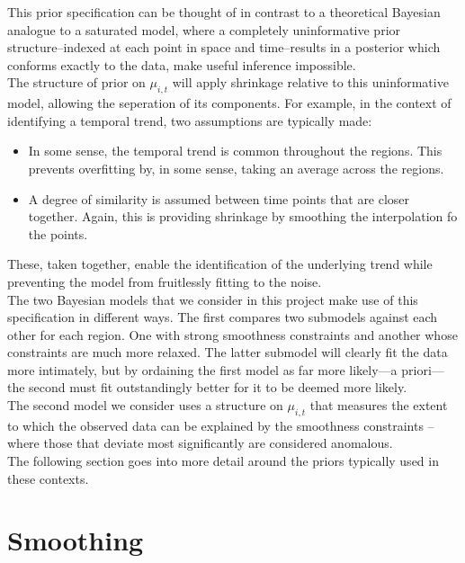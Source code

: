 \documentclass[11pt]{report}
\begin{document}
This prior specification can be thought of in contrast to a theoretical Bayesian analogue to a saturated model, where a completely uninformative prior structure--indexed at each point in space and time--results in a posterior which conforms exactly to the data, make useful inference impossible. \\

The structure of prior on $\mu_{i,t}$ will apply shrinkage relative to this uninformative model, allowing the seperation of its components. For example, in the context of identifying a temporal trend, two assumptions are typically made: 
\begin{itemize}
\item In some sense, the temporal trend is common throughout the regions. This prevents overfitting by, in some sense, taking an average across the regions.
\item A degree of similarity is assumed between time points that are closer together. Again, this is providing shrinkage by smoothing the interpolation fo the points.  
\end{itemize}

These, taken together, enable the identification of the underlying trend while preventing the model from fruitlessly fitting to the noise. \\

The two Bayesian models that we consider in this project make use of this specification in different ways. The first compares two submodels against each other for each region. One with strong smoothness constraints and another whose constraints are much more relaxed. The latter submodel will clearly fit the data more intimately, but by ordaining the first model as far more likely---a priori---the second must fit outstandingly better for it to be deemed more likely. \\

The second model we consider uses a structure on $\mu_{i,t}$ that measures the extent to which the observed data can be explained by the smoothness constraints -- where those that deviate most significantly are considered anomalous. \\

The following section goes into more detail around the priors typically used in these contexts.

 



\chapter{Smoothing}
\end{document}
